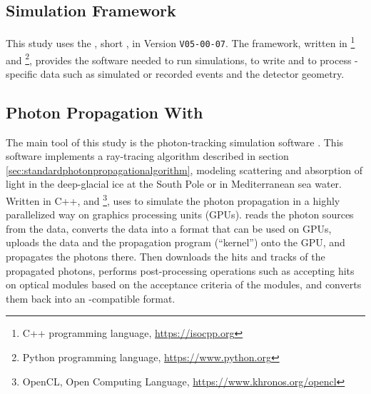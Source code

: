 \label{sec:tools}

\subsection{\icecube Simulation Framework}

This study uses the , short \icesim,
in Version \texttt{V05-00-07}. The framework, written in
\footnote{C++ programming language, \url{https://isocpp.org}}
and
\footnote{Python programming language, \url{https://www.python.org}},
provides the software needed to run simulations, to write and to process
\icecube-specific data such as simulated or recorded events and the
detector geometry.


\subsection{Photon Propagation With \clsim}

The main tool of this study is the photon-tracking simulation software
\clsim. This software implements a ray-tracing algorithm described in
section \ref{sec:standardphotonpropagationalgorithm}, modeling
scattering and absorption of light in the deep-glacial ice at the South
Pole or in Mediterranean sea water. \cite{clsimreadme} Written in C++,
 and
\footnote{OpenCL, Open Computing Language, \url{https://www.khronos.org/opencl}},
\clsim uses  to simulate the photon propagation in a highly
parallelized way on graphics processing units (GPUs). \cite{clsimsource}
\clsim reads the photon sources from the \icesim data, converts the data
into a format that can be used on GPUs, uploads the data and the
propagation program (``kernel'') onto the GPU, and propagates the
photons there. Then \clsim downloads the hits and tracks of the
propagated photons, performs post-processing operations such as
accepting hits on optical modules based on the acceptance criteria of
the modules, and converts them back into an \icesim-compatible format.

